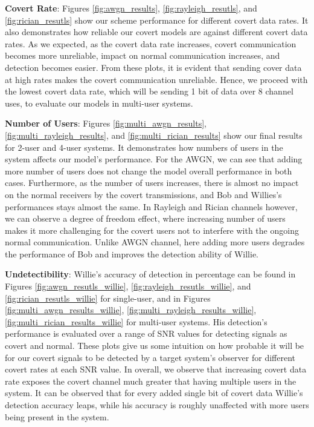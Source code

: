 \textbf{Covert Rate}: Figures \ref{fig:awgn_results}, \ref{fig:rayleigh_resutls}, and \ref{fig:rician_resutls} show our scheme performance for different covert data rates. It also demonstrates how reliable our covert models are against different covert data rates. As we expected, as the covert data rate increases, covert communication becomes more unreliable, impact on normal communication increases, and detection becomes easier. From these plots, it is evident that sending cover data at high rates makes the covert communication unreliable. Hence, we proceed with the lowest covert data rate, which will be sending 1 bit of data over 8 channel uses, to evaluate our models in multi-user systems.

\textbf{Number of Users}: Figures \ref{fig:multi_awgn_results}, \ref{fig:multi_rayleigh_results}, and \ref{fig:multi_rician_results} show our final results for 2-user and 4-user systems. It demonstrates how numbers of users in the system affects our model's performance. For the AWGN, we can see that adding more number of users does not change the model overall performance in both cases. Furthermore, as the number of users increases, there is almost no impact on the normal receivers by the covert transmissions, and Bob and Willies's performances stays almost the same. In Rayleigh and Rician channels however, we can observe a degree of freedom effect, where increasing number of users makes it more challenging for the covert users not to interfere with the ongoing normal communication. Unlike AWGN channel, here adding more users degrades the performance of Bob and improves the detection ability of Willie. 


\textbf{Undetectibility}: Willie's accuracy of detection in percentage can be found in Figures \ref{fig:awgn_resutls_willie}, \ref{fig:rayleigh_resutls_willie}, and \ref{fig:rician_resutls_willie} for single-user, and in Figures \ref{fig:multi_awgn_results_willie}, \ref{fig:multi_rayleigh_results_willie}, \ref{fig:multi_rician_results_willie} for multi-user systems. His detection's performance is evaluated over a range of SNR values for detecting signals as covert and normal. These plots give us some intuition on how probable it will be for our covert signals to be detected by a target system's observer for different covert rates at each SNR value. In overall, we observe that increasing covert data rate exposes the covert channel much greater that having multiple users in the system. It can be observed that for every added single bit of covert data Willie's detection accuracy leaps, while his accuracy is roughly unaffected with more users being present in the system.

